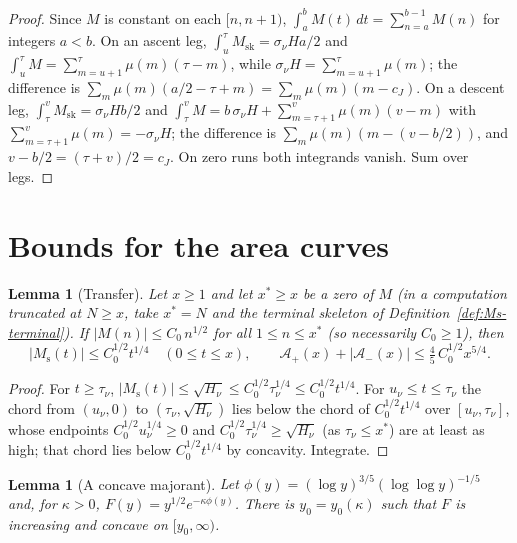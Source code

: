 \documentclass[11pt]{amsart}
\numberwithin{equation}{section}
\theoremstyle{plain}
\newtheorem{lemma}[theorem]{Lemma}
\theoremstyle{definition}
\theoremstyle{remark}
\newcommand{\Ms}{M_{\mathrm{s}}}
\newcommand{\Msk}{M_{\mathrm{sk}}}
\newcommand{\Ap}{\mathcal{A}_{+}}
\newcommand{\Am}{\mathcal{A}_{-}}
\begin{document}
\begin{proof}
Since $M$ is constant on each $[n,n+1)$, $\int_a^bM(t)\,dt=\sum_{n=a}^{b-1}M(n)$
for integers $a<b$. On an ascent leg, $\int_{u}^{\tau}\Msk=\sigma_\nu H a/2$ and
$\int_u^\tau M=\sum_{m=u+1}^{\tau}\mu(m)(\tau-m)$, while
$\sigma_\nu H=\sum_{m=u+1}^{\tau}\mu(m)$; the difference is
$\sum_m\mu(m)(a/2-\tau+m)=\sum_m\mu(m)(m-c_J)$. On a descent leg,
$\int_\tau^v\Msk=\sigma_\nu Hb/2$ and
$\int_\tau^vM=b\,\sigma_\nu H+\sum_{m=\tau+1}^{v}\mu(m)(v-m)$ with
$\sum_{m=\tau+1}^{v}\mu(m)=-\sigma_\nu H$; the difference is
$\sum_m\mu(m)(m-(v-b/2))$, and $v-b/2=(\tau+v)/2=c_J$. On zero runs
both integrands vanish. Sum over legs.
\end{proof}

\section{Bounds for the area curves}
\label{sec:bounds}

\begin{lemma}[Transfer]
\label{lem:transfer}
Let $x\ge1$ and let $x^*\ge x$ be a zero of $M$ (in a computation truncated
at $N\ge x$, take $x^*=N$ and the terminal skeleton of
Definition~\ref{def:Ms-terminal}). If $|M(n)|\le C_0\,n^{1/2}$ for all
$1\le n\le x^*$ (so necessarily $C_0\ge1$), then
\begin{equation}
\label{eq:transfer_bound}
  |\Ms(t)|\le C_0^{1/2}t^{1/4}\quad(0\le t\le x),\qquad
  \Ap(x)+|\Am(x)|\le\tfrac45\,C_0^{1/2}x^{5/4}.
\end{equation}
\end{lemma}

\begin{proof}
For $t\ge\tau_\nu$, $|\Ms(t)|\le\sqrt{H_\nu}\le C_0^{1/2}\tau_\nu^{1/4}\le
C_0^{1/2}t^{1/4}$. For $u_\nu\le t\le\tau_\nu$ the chord from $(u_\nu,0)$ to
$(\tau_\nu,\sqrt{H_\nu})$ lies below the chord of $C_0^{1/2}t^{1/4}$ over
$[u_\nu,\tau_\nu]$, whose endpoints $C_0^{1/2}u_\nu^{1/4}\ge0$ and
$C_0^{1/2}\tau_\nu^{1/4}\ge\sqrt{H_\nu}$ (as $\tau_\nu\le x^*$) are at
least as high; that chord lies below $C_0^{1/2}t^{1/4}$ by concavity.
Integrate.
\end{proof}

\begin{lemma}[A concave majorant]
\label{lem:concave-majorant}
Let $\phi(y)=(\log y)^{3/5}(\log\log y)^{-1/5}$ and, for $\kappa>0$,
$F(y)=y^{1/2}e^{-\kappa\phi(y)}$. There is $y_0=y_0(\kappa)$ such that $F$
is increasing and concave on $[y_0,\infty)$.
\end{lemma}
\end{document}
